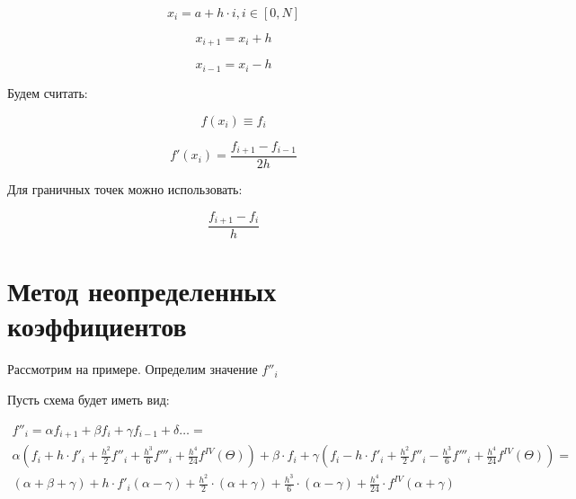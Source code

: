 \documentclass[10pt,a4paper]{article}
\begin{document}
		\begin{equation}
			x_{i} = a + h\cdot i, i \in \left[0, N\right]
		\end{equation}
		
		\begin{equation}
			x_{i + 1} = x_{i} + h
		\end{equation}
		
		\begin{equation}
			x_{i - 1} = x_{i} - h
		\end{equation}
		
		Будем считать:
		
		\begin{equation}
		f\left(x_{i}\right) \equiv f_{i}
		\end{equation}
		
		\begin{equation}
			f'\left(x_{i}\right) = \frac{f_{i + 1} - f_{i - 1}}{2h}
		\end{equation}
		
		Для граничных точек можно использовать:
		
		\begin{equation}
			\frac{f_{i + 1} - f_{i}}{h}
		\end{equation}
		
		
		\section{Метод неопределенных коэффициентов}
		
		Рассмотрим на примере. Определим значение $f''_{i}$
		
		Пусть схема будет иметь вид:
		
		\begin{eqnarray}
			f''_{i} = \alpha f_{i + 1} + \beta f_{i} + \gamma f_{i - 1} + \delta \ldots = \\
			\alpha\left(f_{i} + h\cdot f'_{i} + \frac{h^2}{2}f''_{i} + \frac{h^3}{6}f'''_{i} + \frac{h^4}{24}f^{IV}\left(\Theta\right)\right) + \beta \cdot f_{i} + \gamma \left(f_{i} - h\cdot f'_{i} + \frac{h^2}{2}f''_{i} - \frac{h^3}{6}f'''_{i} + \frac{h^4}{24}f^{IV}\left(\Theta\right)\right)= \\
			\left(\alpha + \beta + \gamma\right) + h\cdot f'_{i}\left(\alpha - \gamma\right) + \frac{h^2}{2}\cdot\left(\alpha + \gamma\right) + \frac{h^3}{6}\cdot \left(\alpha - \gamma\right) + \frac{h^4}{24}\cdot f^{IV}\left(\alpha + \gamma\right) 	
		\end{eqnarray}
			
\end{document}

